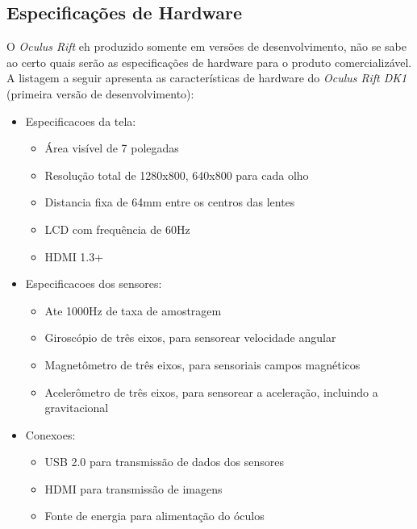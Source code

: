 \subsection{Especificações de Hardware}
O \textit{Oculus Rift} eh produzido somente em versões de desenvolvimento, não se sabe ao certo quais serão as especificações de hardware para o produto comercializável. A listagem a seguir apresenta as características de hardware do \textit{Oculus Rift DK1} (primeira versão de desenvolvimento):
\begin{itemize}
	\item Especificacoes da tela:
		\begin{itemize}
			\item Área visível de 7 polegadas
			\item Resolução total de 1280x800, 640x800 para cada olho
			\item Distancia fixa de 64mm entre os centros das lentes
			\item LCD com frequência de 60Hz
			\item HDMI 1.3+
		\end{itemize}
	\item Especificacoes dos sensores:
		\begin{itemize}
			\item Ate 1000Hz de taxa de amostragem
			\item Giroscópio de três eixos, para sensorear velocidade angular
			\item Magnetômetro de três eixos, para sensoriais campos magnéticos
			\item Acelerômetro de três eixos, para sensorear a aceleração, incluindo a gravitacional
		\end{itemize}
	\item Conexoes:
		\begin{itemize}
			\item USB 2.0 para transmissão de dados dos sensores
			\item HDMI para transmissão de imagens
			\item Fonte de energia para alimentação do óculos
		\end{itemize}
\end{itemize}

